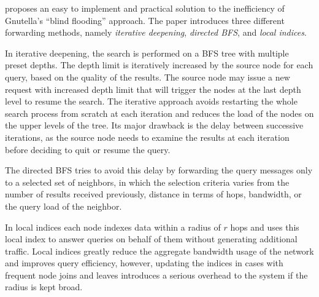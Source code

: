 
\cite{YG-M2002} proposes an easy to implement and practical solution to the
inefficiency of Gnutella's ``blind flooding'' approach. The paper introduces
three different forwarding methods, namely \emph{iterative deepening},
\emph{directed BFS}, and \emph{local indices}.

In iterative deepening, %
the search is
performed on a BFS tree with multiple preset depths. The depth limit is
iteratively increased by the source node for each query, based on the quality of
the results. The source node may issue a new request with increased depth limit
that will trigger the nodes at the last depth level to resume the search. The
iterative approach avoids restarting the whole search process from scratch at
each iteration and reduces the load of the nodes on the upper levels of the
tree. Its major drawback is the delay between successive iterations, as the
source node needs to examine the results at each iteration before deciding to
quit or resume the query.

The directed BFS%
tries to avoid this delay by forwarding the query messages only to a selected
set of neighbors, in which the selection criteria varies from the number of
results received previously, distance in terms of hops, bandwidth, or the query
load of the neighbor.

In local indices%
each node
indexes data within a radius of $r$ hops and uses this local index to answer
queries on behalf of them without generating additional traffic. Local indices
greatly reduce the aggregate bandwidth usage of the network and improves query
efficiency, however, updating the indices in cases with frequent node joins and
leaves introduces a serious overhead to the system if the radius is kept broad.

